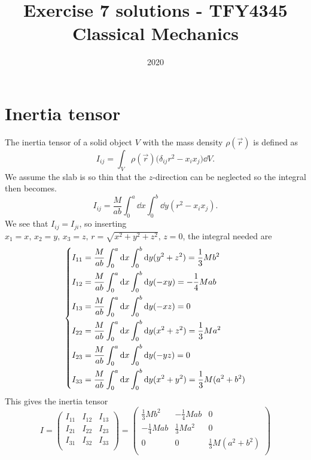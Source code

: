 \documentclass{article}
\title{Exercise 7 solutions - TFY4345 Classical Mechanics}
\date{2020}
\begin{document}
    \maketitle
    \section{Inertia tensor}
        The inertia tensor of a solid object $V$ with the mass density $\rho(\vec r)$ is defined as
        \begin{equation*}
            I_{ij} = \int_V \rho(\vec{r}) \big(\delta_{ij} r^2 - x_ix_j) \dd V.
        \end{equation*}
        We assume the slab is so thin that the $z$-direction can be neglected so the integral then becomes.
        \begin{equation*}
            I_{ij} = \frac{M}{ab} \int_0^a \dd x \int_0^b \dd y ( r^2 - x_ix_j).
        \end{equation*}
        We see that $I_{ij} = I_{ji}$, so inserting $x_1 = x, \, x_2 = y, \, x_3 = z, \, r = \sqrt{x^2 + y^2 + z^2}, \, z = 0$, the integral needed are
        \begin{equation*}
            \begin{dcases}
                I_{1 1} = \frac{M}{ab} \int_0^a \dd x \int_0^b \dd y (y^2 + z^2) = \frac{1}{3}Mb^2\\
                I_{1 2} = \frac{M}{ab} \int_0^a \dd x \int_0^b \dd y (-xy) = -\frac{1}{4}M ab\\
                I_{1 3} = \frac{M}{ab} \int_0^a \dd x \int_0^b \dd y (-xz) = 0\\
                I_{2 2} = \frac{M}{ab} \int_0^a \dd x \int_0^b \dd y (x^2 + z^2) = \frac{1}{3}Ma^2\\
                I_{2 3} = \frac{M}{ab} \int_0^a \dd x \int_0^b \dd y (-yz) = 0\\
                I_{3 3} = \frac{M}{ab} \int_0^a \dd x \int_0^b \dd y (x^2 + y^2) = \frac{1}{3}M(a^2 + b^2)\\
            \end{dcases}    
        \end{equation*}
        This gives the inertia tensor
        \begin{equation*}
            I = \begin{pmatrix}
                I_{11} & I_{12} & I_{13} \\
                I_{21} & I_{22} & I_{23} \\
                I_{31} & I_{32} & I_{33} \\
            \end{pmatrix}
            =
            \begin{pmatrix}
                \frac{1}{3}Mb^2 & -\frac{1}{4}Mab & 0 \\
                -\frac{1}{4}Mab & \frac{1}{3}Ma^2 & 0 \\
                0 & 0 & \frac{1}{3}M(a^2 + b^2)   \\
            \end{pmatrix}
        \end{equation*}
\end{document}
